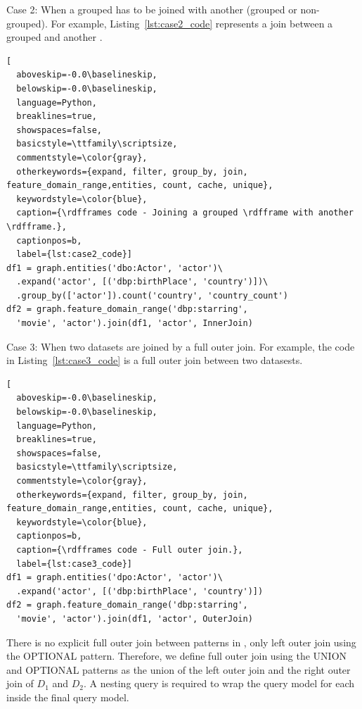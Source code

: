     \item Case 2: When a grouped \rdfframe has to be joined with another \rdfframe (grouped or non-grouped).
    For example, Listing~\ref{lst:case2_code} represents a join between a grouped \rdfframe and another \rdfframe.
\vspace{8pt}
\begin{lstlisting}[
  aboveskip=-0.0\baselineskip,
  belowskip=-0.0\baselineskip,
  language=Python,
  breaklines=true,
  showspaces=false,
  basicstyle=\ttfamily\scriptsize,
  commentstyle=\color{gray},
  otherkeywords={expand, filter, group_by, join, feature_domain_range,entities, count, cache, unique},
  keywordstyle=\color{blue},
  caption={\rdfframes code - Joining a grouped \rdfframe with another \rdfframe.},
  captionpos=b,
  label={lst:case2_code}]
df1 = graph.entities('dbo:Actor', 'actor')\
  .expand('actor', [('dbp:birthPlace', 'country')])\
  .group_by(['actor']).count('country', 'country_count')
df2 = graph.feature_domain_range('dbp:starring',
  'movie', 'actor').join(df1, 'actor', InnerJoin)
\end{lstlisting}
    \item Case 3: When two datasets are joined by a full outer join.
    For example, the \rdfframes code in Listing~\ref{lst:case3_code}
    is a full outer join between two datasests.
\vspace{8pt}
\begin{lstlisting}[
  aboveskip=-0.0\baselineskip,
  belowskip=-0.0\baselineskip,
  language=Python,
  breaklines=true,
  showspaces=false,
  basicstyle=\ttfamily\scriptsize,
  commentstyle=\color{gray},
  otherkeywords={expand, filter, group_by, join, feature_domain_range,entities, count, cache, unique},
  keywordstyle=\color{blue},
  captionpos=b,
  caption={\rdfframes code - Full outer join.},
  label={lst:case3_code}]
df1 = graph.entities('dpo:Actor', 'actor')\
  .expand('actor', [('dbp:birthPlace', 'country')])
df2 = graph.feature_domain_range('dbp:starring',
  'movie', 'actor').join(df1, 'actor', OuterJoin)
\end{lstlisting}

    There is no explicit full outer join between patterns in \sparql, only left outer join using the OPTIONAL pattern. Therefore, we define full outer join using the UNION and OPTIONAL patterns as the union of the left outer join and the right outer join of $D_1$ and $D_2$.
    A nesting query is required to wrap the query model for each \rdfframe inside the final query model.
\squishend

